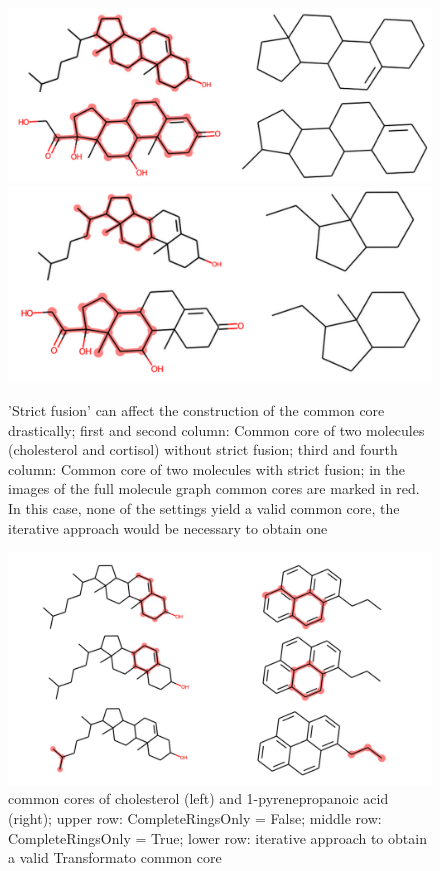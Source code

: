 \begin{figure}
\includegraphics[scale=0.45]{sterols_wo_strictfusion}\includegraphics[scale=0.4]{sterols_w_strictfusion}

\caption{'Strict fusion' can affect the construction of the common core drastically; first and second column: Common core of two molecules (cholesterol
and cortisol) without strict fusion; third and fourth column: Common
core of two molecules with strict fusion; in the images of the full molecule graph common cores are marked in red. In this case, none of the settings yield a valid common core, the iterative approach would be necessary to obtain one }

\end{figure}




\begin{figure}
	\includegraphics[scale=0.6]{cholesterol_pryenepropanoic_acid.png}
	
	\caption{common cores of cholesterol (left) and 1-pyrenepropanoic acid (right); upper row: CompleteRingsOnly = False; middle row: CompleteRingsOnly = True; lower row: iterative approach to obtain a valid Transformato common core}
	\label{fig:pyrene}
\end{figure}

